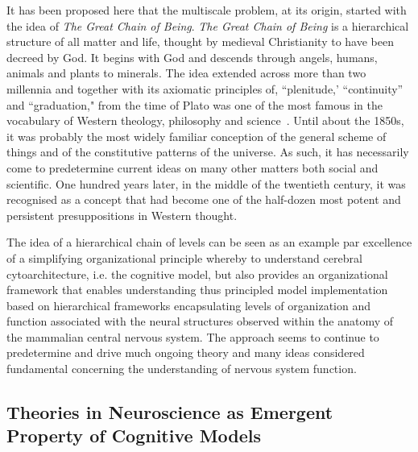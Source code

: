 \documentclass[10pt,letterpaper]{article}
\begin{document}
It has been proposed here that the multiscale problem, at its origin, started with the idea of {\it The Great Chain of Being}. {\it The Great Chain of Being} is a hierarchical structure of all matter and life, thought by medieval Christianity to have been decreed by God. It begins with God and descends through angels, humans, animals and plants to minerals. The idea extended across more than two millennia and together with its axiomatic principles of, ``plenitude,' ``continuity'' and ``graduation," from the time of Plato was one of the most famous in the vocabulary of Western theology, philosophy and science~\cite{lovejoy48}. Until about the 1850s, it was probably the most widely familiar conception of the general scheme of things and of the constitutive patterns of the universe. As such, it has necessarily come to predetermine current ideas on many other matters both social and scientific.  One hundred years later, in the middle of the twentieth century, it was recognised as a concept that had become one of the half-dozen most potent and persistent presuppositions in Western thought.

The idea of a hierarchical chain of levels can be seen as an example par excellence of a simplifying organizational principle whereby to understand cerebral cytoarchitecture, i.e. the cognitive model, but also provides an organizational framework that enables understanding thus principled model implementation based on hierarchical frameworks encapsulating levels of organization and function associated with the neural structures observed within the anatomy of the mammalian central nervous system. The approach seems to continue to predetermine and drive much ongoing theory and many ideas considered fundamental concerning the understanding of nervous system function.


\subsection*{Theories in Neuroscience as Emergent Property of Cognitive Models}
\end{document}
